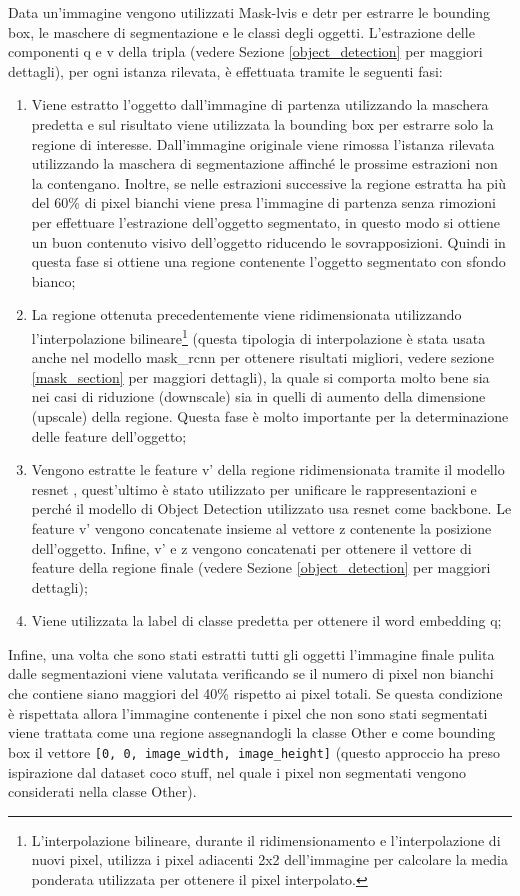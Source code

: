 Data un'immagine vengono utilizzati Mask-\acrshort{lvis} e \acrshort{detr} per estrarre le bounding box, le maschere di segmentazione e le classi degli oggetti. L'estrazione delle componenti q e v della tripla (vedere Sezione \ref{object_detection} per maggiori dettagli), per ogni istanza rilevata, è effettuata tramite le seguenti fasi:
\begin{enumerate}
\item Viene estratto l'oggetto dall'immagine di partenza utilizzando la maschera predetta e sul risultato viene utilizzata la bounding box per estrarre solo la regione di interesse. Dall'immagine originale viene rimossa l'istanza rilevata utilizzando la maschera di segmentazione affinché le prossime estrazioni non la contengano.
Inoltre, se nelle estrazioni successive la regione estratta ha più del 60\% di pixel bianchi viene presa l'immagine di partenza senza rimozioni per effettuare l'estrazione dell'oggetto segmentato, in questo modo si ottiene un buon contenuto visivo dell'oggetto riducendo le sovrapposizioni. Quindi in questa fase si ottiene una regione contenente l'oggetto segmentato con sfondo bianco;
\item La regione ottenuta precedentemente viene ridimensionata utilizzando l'interpolazione bilineare\footnote{L'interpolazione bilineare, durante il ridimensionamento e l'interpolazione di nuovi pixel, utilizza i pixel adiacenti 2x2 dell'immagine per calcolare la media ponderata utilizzata per ottenere il pixel interpolato.} \cite{jaderberg2015spatial} (questa tipologia di interpolazione è stata usata anche nel modello \acrshort{mask_rcnn} per ottenere risultati migliori, vedere sezione \ref{mask_section} per maggiori dettagli), la quale si comporta molto bene sia nei casi di riduzione (downscale) sia in quelli di aumento della dimensione (upscale) della regione. Questa fase è molto importante per la determinazione delle feature dell'oggetto;
\item Vengono estratte le feature v' della regione ridimensionata tramite il modello \acrshort{resnet} \cite{he2016deep}, quest'ultimo è stato utilizzato per unificare le rappresentazioni e perché il modello di Object Detection utilizzato usa \acrshort{resnet} come backbone. Le feature v' vengono concatenate insieme al vettore z contenente la posizione dell'oggetto. Infine, v' e z vengono concatenati per ottenere il vettore di feature della regione finale (vedere Sezione \ref{object_detection} per maggiori dettagli);
\item Viene utilizzata la label di classe predetta per ottenere il word embedding q;
\end{enumerate}
Infine, una volta che sono stati estratti tutti gli oggetti l'immagine finale pulita dalle segmentazioni viene valutata verificando se il numero di pixel non bianchi che contiene siano maggiori del 40\% rispetto ai pixel totali. Se questa condizione è rispettata allora l'immagine contenente i pixel che non sono stati segmentati viene trattata come una regione assegnandogli la classe Other e come bounding box il vettore \texttt{[0, 0, image\_width, image\_height]} (questo approccio ha preso ispirazione dal dataset \acrshort{coco} stuff, nel quale i pixel non segmentati vengono considerati nella classe Other).


